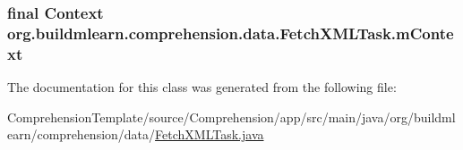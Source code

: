 \subsubsection[{\texorpdfstring{m\+Context}{mContext}}]{\setlength{\rightskip}{0pt plus 5cm}final Context org.\+buildmlearn.\+comprehension.\+data.\+Fetch\+X\+M\+L\+Task.\+m\+Context\hspace{0.3cm}{\ttfamily [private]}}\hypertarget{classorg_1_1buildmlearn_1_1comprehension_1_1data_1_1FetchXMLTask_a174ee55a5116e4f3f57c364712be15c1}{}\label{classorg_1_1buildmlearn_1_1comprehension_1_1data_1_1FetchXMLTask_a174ee55a5116e4f3f57c364712be15c1}


The documentation for this class was generated from the following file\+:\begin{DoxyCompactItemize}
\item 
Comprehension\+Template/source/\+Comprehension/app/src/main/java/org/buildmlearn/comprehension/data/\hyperlink{ComprehensionTemplate_2source_2Comprehension_2app_2src_2main_2java_2org_2buildmlearn_2comprehension_2data_2FetchXMLTask_8java}{Fetch\+X\+M\+L\+Task.\+java}\end{DoxyCompactItemize}

